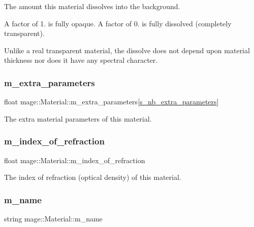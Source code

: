 The amount this material dissolves into the background.

A factor of 1. is fully opaque. A factor of 0. is fully dissolved (completely transparent).

Unlike a real transparent material, the dissolve does not depend upon material thickness nor does it have any spectral character. \hypertarget{structmage_1_1_material_a8b16f762a4bbfb99b98a884d7b4dcee0}{}\label{structmage_1_1_material_a8b16f762a4bbfb99b98a884d7b4dcee0} 
\subsubsection{\texorpdfstring{m\+\_\+extra\+\_\+parameters}{m\_extra\_parameters}}
{\footnotesize\ttfamily float mage\+::\+Material\+::m\+\_\+extra\+\_\+parameters\mbox{[}\hyperlink{structmage_1_1_material_ab8d10c2cb8ab77bee18654e63acaa63a}{s\+\_\+nb\+\_\+extra\+\_\+parameters}\mbox{]}\hspace{0.3cm}{\ttfamily [private]}}

The extra material parameters of this material. \hypertarget{structmage_1_1_material_a8b584541ab8bfc527f856c68bb0152e7}{}\label{structmage_1_1_material_a8b584541ab8bfc527f856c68bb0152e7} 
\subsubsection{\texorpdfstring{m\+\_\+index\+\_\+of\+\_\+refraction}{m\_index\_of\_refraction}}
{\footnotesize\ttfamily float mage\+::\+Material\+::m\+\_\+index\+\_\+of\+\_\+refraction\hspace{0.3cm}{\ttfamily [private]}}

The index of refraction (optical density) of this material. \hypertarget{structmage_1_1_material_a2b3e839a8ae093d53b12529d61ec6605}{}\label{structmage_1_1_material_a2b3e839a8ae093d53b12529d61ec6605} 
\subsubsection{\texorpdfstring{m\+\_\+name}{m\_name}}
{\footnotesize\ttfamily string mage\+::\+Material\+::m\+\_\+name\hspace{0.3cm}{\ttfamily [private]}}

